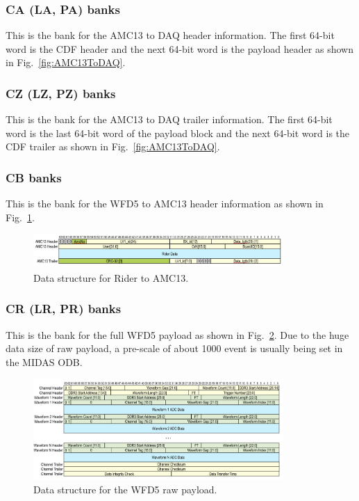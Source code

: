 \subsubsection*{CA (LA, PA) banks}

This is the bank for the AMC13 to DAQ header information.
The first 64-bit word is the CDF header and the next 64-bit word is the payload header as shown in Fig.~\ref{fig:AMC13ToDAQ}.

\subsubsection*{CZ (LZ, PZ) banks}

This is the bank for the AMC13 to DAQ trailer information.
The first 64-bit word is the last 64-bit word of the payload block and the next 64-bit word is the CDF trailer as shown in Fig.~\ref{fig:AMC13ToDAQ}.


\subsubsection*{CB banks}

This is the bank for the WFD5 to AMC13 header information as shown in Fig.~\ref{fig:RiderToAMC13}.

\begin{figure}[htbp]
\centering
\includegraphics[width=0.85\textwidth]{pics/RiderToAMC13.pdf} 
\caption{Data structure for Rider to AMC13.}\label{fig:RiderToAMC13}
\end{figure}

\subsubsection*{CR (LR, PR) banks}

This is the bank for the full WFD5 payload as shown in Fig.~\ref{fig:RiderData}. Due to the huge data size of raw payload, a pre-scale of about 1000 event is usually being set in the MIDAS ODB.

\begin{figure}[htbp]
\centering
\includegraphics[width=0.85\textwidth]{pics/RiderData.pdf} 
\caption{Data structure for the WFD5 raw payload.}\label{fig:RiderData}
\end{figure}


